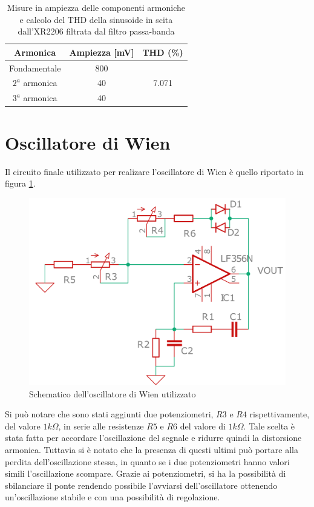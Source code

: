 \documentclass[titlepage]{report}
\begin{document}
	\begin{table}[h!]
		\centering
		\begin{tabular}{||c|c|c||}
			\hline
			\cellcolor{gray!10}Armonica & \cellcolor{gray!10}Ampiezza [mV] & \cellcolor{gray!10}THD (\%) \\
			\hline
			Fondamentale & 800 &\\
			\cline{1-2}
			$2^a$ armonica & 40 & 7.071 \\
			\cline{1-2} 
			$3^a$ armonica & 40 & \\
			\hline	
		\end{tabular}
		\caption{Misure in ampiezza delle componenti armoniche e calcolo del THD della sinusoide in scita dall'XR2206 filtrata dal filtro passa-banda}
		\label{tab:THD_XR2206+BP}
	\end{table}

\section{Oscillatore di Wien}

Il circuito finale utilizzato per realizare l'oscillatore di Wien è quello riportato in figura \ref{sch:osc_wien}.



\begin{figure}[H]
	\centering
	\includegraphics[scale=0.5]{Immagini/sch_osc_wien_cad.pdf}
	\caption{Schematico dell'oscillatore di Wien utilizzato}
	\label{sch:osc_wien}
\end{figure}

Si può notare che sono stati aggiunti due potenziometri, $R3$ e $R4$ rispettivamente, del valore  $1k\Omega$,  in serie alle resistenze $R5$ e $R6$ del valore di  $1k\Omega$. Tale scelta è stata fatta per accordare l'oscillazione del segnale e ridurre quindi la distorsione armonica. Tuttavia si è notato che la presenza di questi ultimi può portare alla perdita dell'oscillazione stessa, in quanto se i due potenziometri hanno valori simili l'oscillazione scompare. Grazie ai potenziometri, si ha la possibilità di sbilanciare il ponte rendendo possibile l'avviarsi dell'oscillatore ottenendo un'oscillazione stabile e con una possibilità di regolazione.
\end{document}
